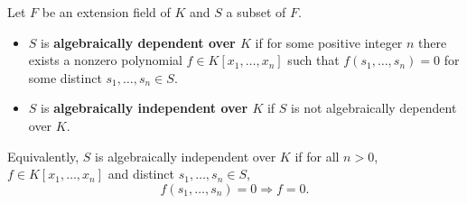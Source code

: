 Let $F$ be an extension field of $K$ and $S$ a subset of $F$.
\begin{itemize}
\item $S$ is \textbf{algebraically dependent over $K$} if for some positive integer $n$ there exists a nonzero polynomial $f \in K[x_1, \ldots, x_n]$ such that $f(s_1, \ldots, s_n) = 0$ for some distinct $s_1, \ldots, s_n \in S$.
\item $S$ is \textbf{algebraically independent over $K$} if $S$ is not algebraically dependent over $K$.
\end{itemize}
Equivalently, $S$ is algebraically independent over $K$ if for all $n > 0$, $f \in K[x_1, \ldots, x_n]$ and distinct $s_1, \ldots, s_n \in S$,
\[
f(s_1, \ldots, s_n) = 0 \Rightarrow f = 0.
\]
